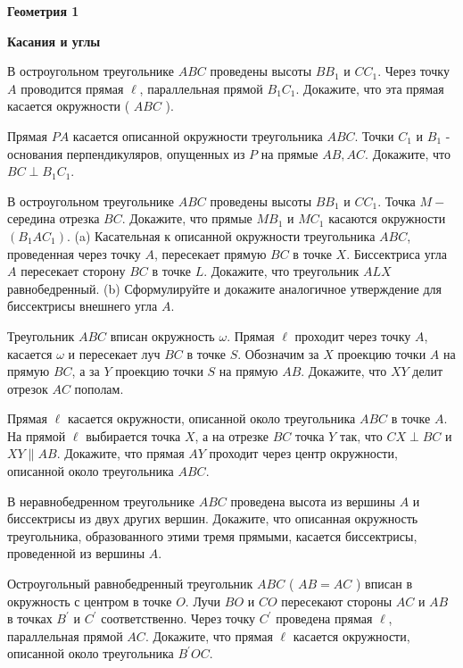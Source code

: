 \centerline{\bf \Huge Геометрия 1}
\centerline{\bf \Huge Касания и углы}

\begin{flushright}
        \scriptsize{}
\end{flushright}


В остроугольном треугольнике $A B C$ проведены высоты $B B_1$ и $C C_1$. Через точку $A$ проводится прямая $\ell$, параллельная прямой $B_1 C_1$. Докажите, что эта прямая касается окружности ( $A B C$ ).

Прямая $P A$ касается описанной окружности треугольника $A B C$. Точки $C_1$ и $B_1$ - основания перпендикуляров, опущенных из $P$ на прямые $A B, A C$. Докажите, что $B C \perp B_1 C_1$.

В остроугольном треугольнике $A B C$ проведены высоты $B B_1$ и $C C_1$. Точка $M-$ середина отрезка $B C$. Докажите, что прямые $M B_1$ и $M C_1$ касаются окружности $\left(B_1 A C_1\right)$.
(a) Касательная к описанной окружности треугольника $A B C$, проведенная через точку $A$, пересекает прямую $B C$ в точке $X$. Биссектриса угла $A$ пересекает сторону $B C$ в точке $L$. Докажите, что треугольник $A L X$ равнобедренный. (b) Сформулируйте и докажите аналогичное утверждение для биссектрисы внешнего угла $A$.

Треугольник $A B C$ вписан окружность $\omega$. Прямая $\ell$ проходит через точку $A$, касается $\omega$ и пересекает луч $B C$ в точке $S$. Обозначим за $X$ проекцию точки $A$ на прямую $B C$, а за $Y$ проекцию точки $S$ на прямую $A B$. Докажите, что $X Y$ делит отрезок $A C$ пополам.

Прямая $\ell$ касается окружности, описанной около треугольника $A B C$ в точке $A$. На прямой $\ell$ выбирается точка $X$, а на отрезке $B C$ точка $Y$ так, что $C X \perp B C$ и $X Y \| A B$. Докажите, что прямая $A Y$ проходит через центр окружности, описанной около треугольника $A B C$.

В неравнобедренном треугольнике $A B C$ проведена высота из вершины $A$ и биссектрисы из двух других вершин. Докажите, что описанная окружность треугольника, образованного этими тремя прямыми, касается биссектрисы, проведенной из вершины $A$.

Остроугольный равнобедренный треугольник $A B C$ ( $A B=A C$ ) вписан в окружность с центром в точке $O$. Лучи $B O$ и $C O$ пересекают стороны $A C$ и $A B$ в точках $B^{\prime}$ и $C^{\prime}$ соответственно. Через точку $C^{\prime}$ проведена прямая $\ell$, параллельная прямой $A C$. Докажите, что прямая $\ell$ касается окружности, описанной около треугольника $B^{\prime} O C$.
